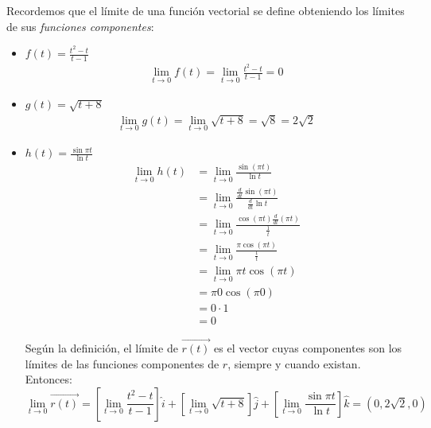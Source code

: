 \documentclass[12pt]{article}
\begin{document}
Recordemos que el límite de una función vectorial se define obteniendo los límites de sus \textit{funciones componentes}:
\begin{itemize}[format=\textbf]

\item $f(t)=\frac{t^2-t}{t-1}$
  \begin{align*}
    \lim_{t \to 0} f(t) = \lim_{t \to 0} \frac{t^2-t}{t-1} = 0
  \end{align*}

\item $g(t)=\sqrt{t+8}$
  \begin{align*}
    \lim_{t \to 0} g(t) = \lim_{t \to 0} \sqrt{t+8} = \sqrt{8} = 2\sqrt{2}
  \end{align*}

\item $h(t)=\frac{\sin{\pi t}}{\ln{t}}$
  \begin{align*}
    \lim_{t \to 0} h(t)
    &= \lim_{t \to 0} \frac{\sin{(\pi t)}}{\ln{t}} \\
    &= \lim_{t \to 0} \frac{\frac{d}{dt} \sin{(\pi t)}}{ \frac{d}{dt} \ln{t}} \\
    &= \lim_{t \to 0} \frac{\cos{(\pi t)} \frac{d}{dt}(\pi t) }{ \frac{1}{t} } \\
    &= \lim_{t \to 0} \frac{\pi \cos{(\pi t)}}{ \frac{1}{t} } \\
    &= \lim_{t \to 0} \pi t \cos{(\pi t)} \\
    &= \pi 0 \cos{(\pi 0)} \\
    &= 0 \cdot 1 \\
    &= 0
  \end{align*}

  Según la definición, el límite de $\vec{r(t)}$ es el vector cuyas componentes son los límites de las funciones componentes de $r$, siempre y cuando existan. Entonces:
  \[
 \lim_{t \to 0} \vec{r(t)} = \left[ \lim_{t \to 0} \frac{t^2-t}{t-1} \right] \hat{i}+ \left[ \lim_{t \to 0} \sqrt{t+8} \right]\hat{j}+ \left[ \lim_{t \to 0} \frac{\sin{\pi t}}{\ln{t}} \right]\hat{k} = (0, 2\sqrt{2}, 0)
  \]
\end{itemize}

\end{document}
